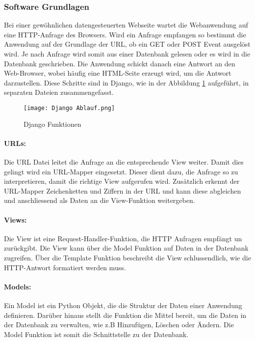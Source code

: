  \newpage
\subsubsection{Software Grundlagen}\label{subsubsec:SoftwareGrundlagen}
Bei einer gewöhnlichen datengesteuerten Webseite wartet die Webanwendung auf eine HTTP-Anfrage des Browsers. Wird ein Anfrage empfangen so bestimmt die Anwendung auf der Grundlage der URL, ob ein GET oder POST Event ausgelöst wird. Je nach Anfrage wird somit aus einer Datenbank gelesen oder es wird in die Datenbank geschrieben. Die Anwendung schickt danach eine Antwort an den Web-Browser, wobei häufig eine HTML-Seite erzeugt wird, um die Antwort darzustellen. Diese Schritte sind in Django, wie in der Abbildung \ref{fig:DjangoAblauf} aufgeführt,  in separaten Dateien zusammengefasst.
\begin{figure} [H]
	\centering
	\texttt{[image: Django Ablauf.png]}
	\caption{Django Funktionen}
	\label{fig:DjangoAblauf}
\end{figure}

\paragraph{URLs: }\label{par:1URLs}
Die URL Datei leitet die Anfrage an die entsprechende View weiter. Damit dies gelingt wird ein URL-Mapper eingesetzt. Dieser dient dazu, die Anfrage so zu interpretieren, damit die richtige View aufgerufen wird. Zusätzlich erkennt der URL-Mapper Zeichenketten und Ziffern in der URL und kann diese abgleichen und anschliessend als Daten an die View-Funktion weitergeben.

\paragraph{Views: }\label{par:1Views}
Die View ist eine Request-Handler-Funktion, die HTTP Anfragen empfängt un zurückgibt. Die View kann über die Model Funktion auf Daten in der Datenbank zugreifen. Über die Template Funktion beschreibt die View schlussendlich, wie die HTTP-Antwort formatiert werden muss.

\paragraph{Models: }\label{par:1Models}
Ein Model ist ein Python Objekt, die die Struktur der Daten einer Anwendung definieren. Darüber hinaus stellt die Funktion die Mittel bereit, um die Daten in der Datenbank zu verwalten, wie z.B Hinzufügen, Löschen oder Ändern. Die Model Funktion ist somit die Schnittstelle zu der Datenbank.

